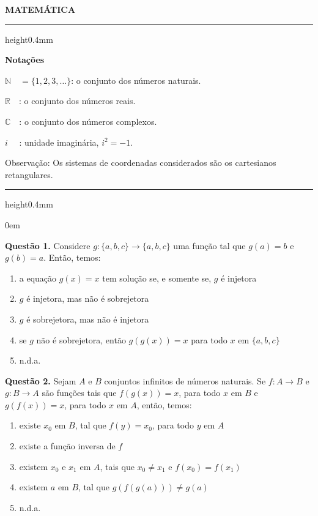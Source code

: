 \documentclass[11pt]{article}
\newcommand*\varhrulefill[1][0.4pt]{\leavevmode\leaders\hrule height#1\hfill\kern0pt}
\begin{document}
\begin{center}
    \textbf{MATEMÁTICA}
\end{center}

\noindent\varhrulefill[0.4mm]

\vspace{6pt}

\noindent \textbf{Notações}

\vspace{6pt}

$\mathbb{N}\quad = \{ 1,2,3, \dots \}$: o conjunto dos números naturais.

$\mathbb{R}\quad$: o conjunto dos números reais.

$\mathbb{C}\quad$: o conjunto dos números complexos.

$i \, \, \quad$: unidade imaginária, $i^2 = -1$.

\vspace{6pt}

\noindent Observação: Os sistemas de coordenadas considerados são os cartesianos retangulares.

\noindent\varhrulefill[0.4mm]

\vspace{6pt}

\parindent0em

\textbf{Questão 1.} Considere $g:\{a,b,c\} \rightarrow \{a,b,c\}$ uma função tal que $g(a) = b$ e $g(b) = a$. Então, temos:

\begin{enumerate}[\bf A (\quad)]
	\item a equação $g(x) = x$ tem solução se, e somente se, $g$ é injetora
    \item $g$ é injetora, mas não é sobrejetora
    \item $g$ é sobrejetora, mas não é injetora
    \item se $g$ não é sobrejetora, então $g(g(x)) = x$ para todo $x$ em $\{a,b,c\}$
    \item n.d.a.
\end{enumerate}


\textbf{Questão 2.} Sejam $A$ e $B$ conjuntos infinitos de números naturais. Se $f : A \rightarrow B$ e $g : B \rightarrow A$ são funções tais que $f(g(x)) = x$, para todo $x$ em $B$ e $g(f(x)) = x$, para todo $x$ em $A$, então, temos:  

\begin{enumerate}[\bf A (\quad)]
	\item existe $x_0$ em $B$, tal que $f(y) = x_0$, para todo $y$ em $A$
    \item existe a função inversa de $f$
    \item existem $x_0$ e $x_1$ em $A$, tais que $x_0 \neq x_1$ e $f(x_0) = f(x_1)$
    \item existem $a$ em $B$, tal que $g(f(g(a))) \neq g(a)$
    \item n.d.a.
\end{enumerate}
\end{document}
